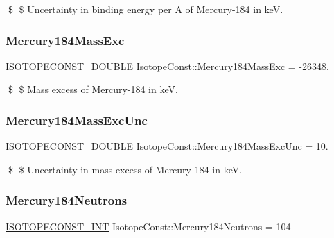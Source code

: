 \$ \$ Uncertainty in binding energy per A of Mercury-\/184 in keV. \mbox{\label{group___isotope_const-_mercury-_hg184_ga561d14c3abaf268b6a220147edfbf623}} 
\subsubsection{\texorpdfstring{Mercury184\+Mass\+Exc}{Mercury184MassExc}}
{\footnotesize\ttfamily \mbox{\hyperlink{group___isotope_const-_macros_ga8f45a7272ce02c0b4c65c44636ed719a}{I\+S\+O\+T\+O\+P\+E\+C\+O\+N\+S\+T\+\_\+\+D\+O\+U\+B\+LE}} Isotope\+Const\+::\+Mercury184\+Mass\+Exc = -\/26348.}

\$ \$ Mass excess of Mercury-\/184 in keV. \mbox{\label{group___isotope_const-_mercury-_hg184_gaeed432695cd1e9d3c297658a707e0218}} 
\subsubsection{\texorpdfstring{Mercury184\+Mass\+Exc\+Unc}{Mercury184MassExcUnc}}
{\footnotesize\ttfamily \mbox{\hyperlink{group___isotope_const-_macros_ga8f45a7272ce02c0b4c65c44636ed719a}{I\+S\+O\+T\+O\+P\+E\+C\+O\+N\+S\+T\+\_\+\+D\+O\+U\+B\+LE}} Isotope\+Const\+::\+Mercury184\+Mass\+Exc\+Unc = 10.}

\$ \$ Uncertainty in mass excess of Mercury-\/184 in keV. \mbox{\label{group___isotope_const-_mercury-_hg184_ga1844027f232592428d2eaae986d2071f}} 
\subsubsection{\texorpdfstring{Mercury184\+Neutrons}{Mercury184Neutrons}}
{\footnotesize\ttfamily \mbox{\hyperlink{group___isotope_const-_macros_ga5f18360b3e99483a35c32d789e62621c}{I\+S\+O\+T\+O\+P\+E\+C\+O\+N\+S\+T\+\_\+\+I\+NT}} Isotope\+Const\+::\+Mercury184\+Neutrons = 104}

